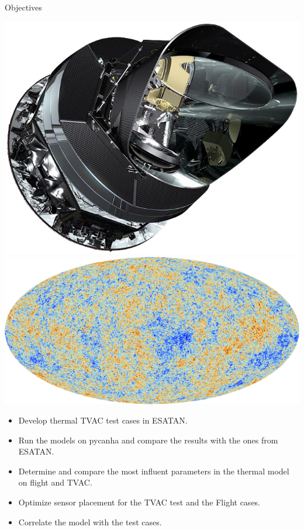 \documentclass{cubeamer}
\begin{document}
\begin{frame}{Objectives}
    \begin{minipage}{0.3\textwidth}
        \includegraphics[width=0.9\linewidth]{Figures/Planck1.jpg} \\
        \includegraphics[width=0.9\linewidth]{Figures/Planck2.jpg}
    \end{minipage}
    \begin{minipage}{0.65\textwidth}
        \begin{itemize}
            \item Develop thermal TVAC test cases in ESATAN.
            \item Run the models on pycanha and compare the results with the ones from ESATAN.
            \item Determine and compare the most influent parameters in the thermal model on flight and TVAC.
            \item Optimize sensor placement for the TVAC test and the Flight cases. 
            \item Correlate the model with the test cases.
        \end{itemize}
    \end{minipage}
\end{frame}
\end{document}
